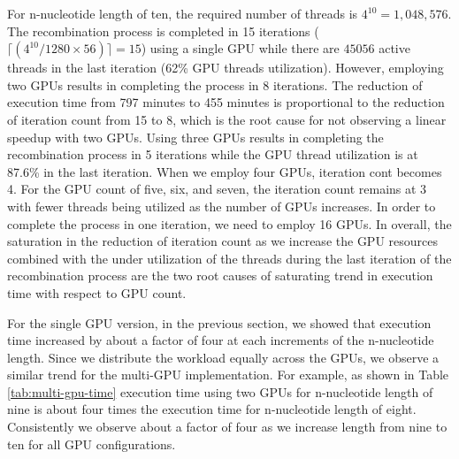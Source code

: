 For n-nucleotide length of ten, the required number of threads is $4^{10}=1,048,576$.  The recombination process is completed in 15 iterations ($\lceil(4^{10}/1280\times56)\rceil=15 $) using a single GPU while there are $45056$ active threads in the last iteration (62\% GPU threads utilization). However, employing two GPUs results in completing the process in 8 iterations.  The reduction of execution time from 797 minutes to 455 minutes is proportional to the reduction of iteration count from 15 to 8, which is the root cause for not observing a linear speedup with two GPUs. Using three GPUs results in completing the recombination process in 5 iterations while the GPU thread utilization is at 87.6\% in the last iteration. When we employ four GPUs, iteration cont becomes 4. For the GPU count of five, six, and seven, the iteration count remains at 3 with fewer threads being utilized as the number of GPUs increases.  In order to complete the process in one iteration, we need to employ 16 GPUs. In overall, the saturation in the reduction of iteration count as we increase the GPU resources combined with the under utilization of the threads during the last iteration of the recombination process are the two root causes of saturating trend in execution time with respect to GPU count. 


For the single GPU version, in the previous section, we showed that execution time increased by about a factor of four at each increments of the n-nucleotide length. Since we distribute the workload equally across the GPUs, we observe  a similar  trend for the multi-GPU implementation. For example, as shown in Table \ref{tab:multi-gpu-time}   execution time using two GPUs for n-nucleotide length of nine is about four times the execution time for n-nucleotide length of eight. Consistently we observe about a factor of four as we increase length from nine to ten for all GPU configurations. 

